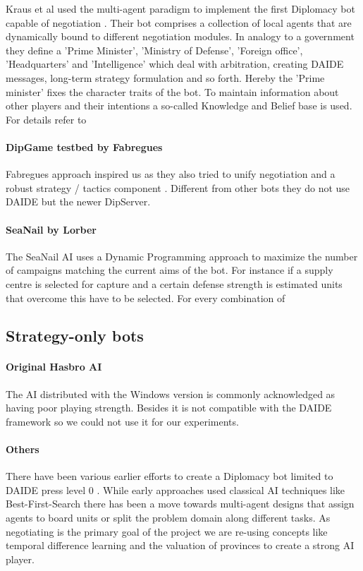 \documentclass[pdftex,11pt,a4paper]{report}
\begin{document}
Kraus et al used the multi-agent paradigm to implement the first
Diplomacy bot capable of negotiation \cite{Kraus95}. Their bot
comprises a collection of local agents that are dynamically bound to
different negotiation modules. In analogy to a government they define
a 'Prime Minister', 'Ministry of Defense', 'Foreign office',
'Headquarters' and 'Intelligence' which deal with arbitration,
creating DAIDE messages, long-term strategy formulation and so
forth. Hereby the 'Prime minister' fixes the character traits of the
bot. To maintain information about other players and their intentions
a so-called Knowledge and Belief base is used. For details refer to
\cite{Kraus88}

\paragraph{DipGame testbed by Fabregues}

Fabregues approach inspired us as they also tried to unify negotiation
and a robust strategy / tactics component \cite{Fabregues11}. Different
from other bots they do not use DAIDE but the newer DipServer. 

\paragraph{SeaNail by Lorber}

The SeaNail AI \cite{Lorber98} uses a Dynamic Programming approach to
maximize the number of campaigns matching the current aims of the
bot. For instance if a supply centre is selected for capture and a
certain defense strength is estimated units that overcome this have to
be selected. For every combination of

\subsection{Strategy-only bots}

\paragraph{Original Hasbro AI}
The AI distributed with the Windows version is commonly 
acknowledged as having poor playing strength. Besides it is not
compatible with the DAIDE framework so we could not use it for
our experiments.

\paragraph{Others}
There have been various earlier efforts to create a Diplomacy bot
limited to DAIDE press level 0 \cite{DAIDEsyntax10}. While early
approaches used classical AI techniques like Best-First-Search there
has been a move towards multi-agent designs that assign agents to
board units or split the problem domain along different tasks. As
negotiating is the primary goal of the project we are re-using
concepts like temporal difference learning \cite{Levinson94} and the
valuation of provinces \cite{Huff05} to create a strong AI player.
\end{document}
